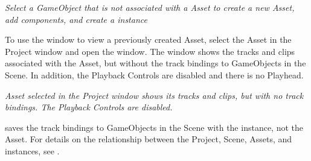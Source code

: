 {\itshape Select a Game\+Object that is not associated with a  Asset to create a new  Asset, add components, and create a  instance}

To use the  window to view a previously created  Asset, select the  Asset in the Project window and open the  window. The  window shows the tracks and clips associated with the  Asset, but without the track bindings to Game\+Objects in the Scene. In addition, the  Playback Controls are disabled and there is no  Playhead.



{\itshape {} Asset selected in the Project window shows its tracks and clips, but with no track bindings. The  Playback Controls are disabled.}

 saves the track bindings to Game\+Objects in the Scene with the  instance, not the  Asset. For details on the relationship between the Project, Scene,  Assets, and  instances, see . 